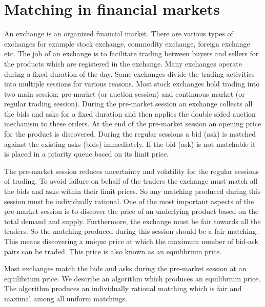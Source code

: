 \documentclass[a4paper,UKenglish,cleveref, autoref]{lipics-v2019}
\begin{document}
\begin{theorem}
\end{theorem}


\section{Matching in financial markets}\label{sec:matchingInMarkets} 
An exchange is an organized financial market. There are various types of exchanges for example stock exchange, commodity exchange, foreign exchange etc. The job of an exchange is to facilitate trading between buyers and sellers for the products which are registered in the exchange. Many exchanges operate during a fixed duration of the day. Some exchanges divide the trading activities into multiple sessions for various reasons. Most stock exchanges hold trading into two main session; pre-market (or auction session) and continuous  market (or regular trading session). During the pre-market session an exchange collects all the bids and asks for a fixed duration and then applies the double sided auction mechanism to these orders. At the end of the pre-market session an opening price for the product is discovered. During the regular sessions a bid (ask) is matched against the existing asks (bids) immediately. If the bid (ask) is not matchable it is placed in a priority queue based on its limit price. 

The pre-market session reduces uncertainty and volatility for the regular sessions of trading. To avoid failure on behalf of the traders the exchange must match all the bids and asks within their limit prices. So any matching produced during this session must be individually rational. One of the most important aspects of the pre-market session is to discover the price of an underlying product based on the total demand and supply. Furthermore, the exchange must be fair towards all the traders. So the matching produced during this session should be a fair matching.  This means discovering  a unique price at which the maximum number of  bid-ask pairs can be traded. This price is also known as an equilibrium price. 

Most exchanges match the bids and asks during the pre-market session at an equilibrium price.   We describe an algorithm which produces an equilibrium price. The algorithm  produces an individually rational matching which is fair and maximal among all uniform matchings.
\end{document}
